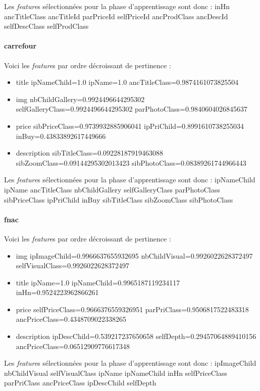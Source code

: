 \documentclass{article}
\begin{document}
Les \emph{feature}s sélectionnées pour la phase d'apprentissage sont donc :
inHn ancTitleClass ancTitleId parPriceId selfPriceId ancProdClass ancDescId selfDescClass selfProdClass

\paragraph{carrefour}
Voici les \emph{feature}s par ordre décroissant de pertinence :
\begin{itemize}
    \item{title} ipNameChild=1.0 ipName=1.0 ancTitleClass=0.9874161073825504
    \item{img} nbChildGallery=0.9924496644295302 selfGalleryClass=0.9924496644295302 parPhotoClass=0.9840604026845637
    \item{price} sibPriceClass=0.9739932885906041 ipPriChild=0.8991610738255034 inBuy=0.43833892617449666
    \item{description} sibTitleClass=0.09228187919463088 sibZoomClass=0.09144295302013423 sibPhotoClass=0.08389261744966443
\end{itemize}

Les \emph{feature}s sélectionnées pour la phase d'apprentissage sont donc :
ipNameChild ipName ancTitleClass nbChildGallery selfGalleryClass parPhotoClass sibPriceClass ipPriChild inBuy sibTitleClass sibZoomClass sibPhotoClass

\paragraph{fnac}
Voici les \emph{feature}s par ordre décroissant de pertinence :
\begin{itemize}
    \item{img} ipImageChild=0.9966637655932695 nbChildVisual=0.9926022628372497 selfVisualClass=0.9926022628372497
    \item{title} ipName=1.0 ipNameChild=0.9965187119234117 inHn=0.9524223962866261
    \item{price} selfPriceClass=0.9666376559326951 parPriClass=0.9506817522483318 ancPriceClass=0.4348709022338265
    \item{description} ipDescChild=0.539217237650658 selfDepth=0.29457064889410156 ancPriceClass=0.06512909776617348
\end{itemize}

Les \emph{feature}s sélectionnées pour la phase d'apprentissage sont donc :
ipImageChild nbChildVisual selfVisualClass ipName ipNameChild inHn selfPriceClass parPriClass ancPriceClass ipDescChild selfDepth
\end{document}

